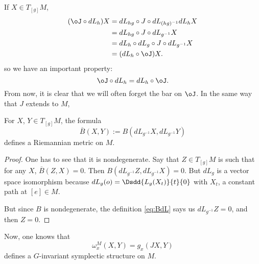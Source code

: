 \noindent If $X\in T_{[g]}M$,
\begin{equation}\nonumber
\begin{split}
  (\oJ\circ dL_h)X&=dL_{hg}\circ J\circ dL_{(hg)^{-1}}dL_h X\\
           &=dL_{hg}\circ J\circ dL_{g^{-1}} X\\
	   &=dL_h\circ dL_g\circ J\circ dL_{g^{-1}} X\\
	   &=(dL_h\circ \oJ)X.
\end{split}
\end{equation}
so we have an important property:
\begin{equation}\label{eq:J_dL}
   \oJ\circ dL_h=dL_h\circ\oJ.
\end{equation}
From now, it is clear that we will often forget the bar on $\oJ$.  In the same way that $J$ extends to $M$, 

\begin{proposition}
For $X$, $Y\in T_{[g]}M$, the formula
\begin{equation}\label{eq:BdL}
  \overline{ B }(X,Y):=B(dL_{g^{-1}}X,dL_{g^{-1}}Y)
\end{equation}
defines a Riemannian metric on $M$.

\end{proposition}

\begin{proof}
One has to see that it is nondegenerate. Say that $Z\in T_{[g]}M$ is such that for any $X$, 
$\overline{ B }(Z,X)=0$. Then $B(dL_{g^{-1}}Z,dL_{g^{-1}}X)=0$. But $dL_g$ is a vector space isomorphism because 
$dL_g(o)=\Dsdd{L_g(X_t)}{t}{0}$ with $X_t$, a constant path at $[e]\in M$.
       
But since $B$ is nondegenerate, the definition \eqref{eq:BdL} says us $dL_{g^{-1}}Z=0$, and then $Z=0$.
\end{proof}

Now, one knows that 
\begin{equation}
  \omega^M_x(X,Y)=g_x(JX,Y)
\end{equation}
defines a $G$-invariant symplectic structure on $M$.

